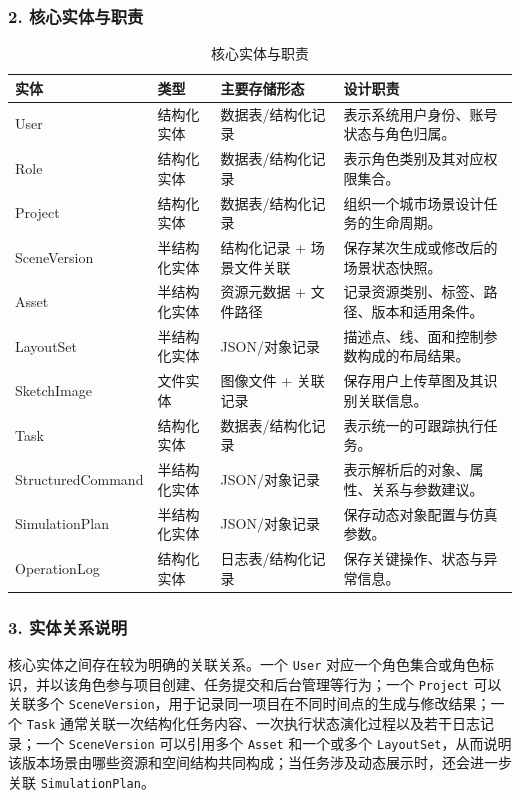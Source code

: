 \subsubsection*{2. 核心实体与职责}
\begin{table}[H]
\centering
\caption{核心实体与职责}
\label{tab:core_entities}
\begin{tabularx}{\textwidth}{p{2.2cm} p{1.8cm} p{2.2cm} Y}
\toprule
实体 & 类型 & 主要存储形态 & 设计职责 \\
\midrule
User & 结构化实体 & 数据表/结构化记录 & 表示系统用户身份、账号状态与角色归属。 \\
Role & 结构化实体 & 数据表/结构化记录 & 表示角色类别及其对应权限集合。 \\
Project & 结构化实体 & 数据表/结构化记录 & 组织一个城市场景设计任务的生命周期。 \\
SceneVersion & 半结构化实体 & 结构化记录 + 场景文件关联 & 保存某次生成或修改后的场景状态快照。 \\
Asset & 半结构化实体 & 资源元数据 + 文件路径 & 记录资源类别、标签、路径、版本和适用条件。 \\
LayoutSet & 半结构化实体 & JSON/对象记录 & 描述点、线、面和控制参数构成的布局结果。 \\
SketchImage & 文件实体 & 图像文件 + 关联记录 & 保存用户上传草图及其识别关联信息。 \\
Task & 结构化实体 & 数据表/结构化记录 & 表示统一的可跟踪执行任务。 \\
StructuredCommand & 半结构化实体 & JSON/对象记录 & 表示解析后的对象、属性、关系与参数建议。 \\
SimulationPlan & 半结构化实体 & JSON/对象记录 & 保存动态对象配置与仿真参数。 \\
OperationLog & 结构化实体 & 日志表/结构化记录 & 保存关键操作、状态与异常信息。 \\
\bottomrule
\end{tabularx}
\end{table}

\subsubsection*{3. 实体关系说明}
核心实体之间存在较为明确的关联关系。一个 \texttt{User} 对应一个角色集合或角色标识，并以该角色参与项目创建、任务提交和后台管理等行为；一个 \texttt{Project} 可以关联多个 \texttt{SceneVersion}，用于记录同一项目在不同时间点的生成与修改结果；一个 \texttt{Task} 通常关联一次结构化任务内容、一次执行状态演化过程以及若干日志记录；一个 \texttt{SceneVersion} 可以引用多个 \texttt{Asset} 和一个或多个 \texttt{LayoutSet}，从而说明该版本场景由哪些资源和空间结构共同构成；当任务涉及动态展示时，还会进一步关联 \texttt{SimulationPlan}。

